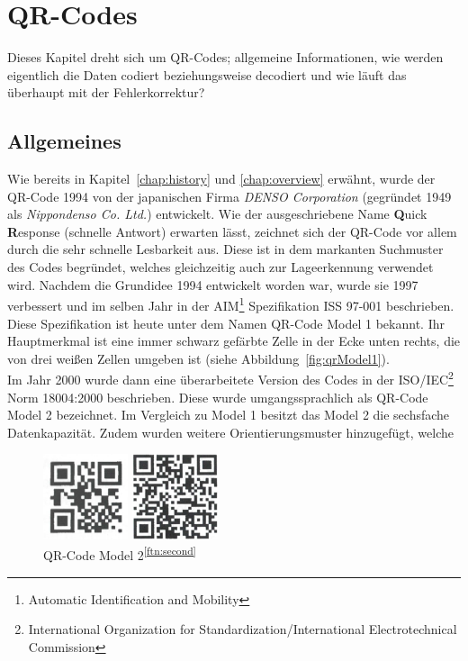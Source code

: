 \section{QR-Codes}\label{chap:qrcodes}
Dieses Kapitel dreht sich um QR-Codes; allgemeine Informationen, wie werden eigentlich die Daten codiert beziehungsweise decodiert und wie läuft das überhaupt mit der Fehlerkorrektur?

\subsection{Allgemeines}
Wie bereits in Kapitel~\ref{chap:history} und \ref{chap:overview} erwähnt, wurde der QR-Code 1994 von der japanischen Firma \textit{DENSO Corporation} (gegründet 1949 als \textit{Nippondenso Co. Ltd.}) entwickelt. Wie der ausgeschriebene Name \textbf{Q}uick \textbf{R}esponse (schnelle Antwort) erwarten lässt, zeichnet sich der QR-Code vor allem durch die sehr schnelle Lesbarkeit aus. Diese ist in dem markanten Suchmuster des Codes begründet, welches gleichzeitig auch zur Lageerkennung verwendet wird.
Nachdem die Grundidee 1994 entwickelt worden war, wurde sie 1997 verbessert und im selben Jahr in der AIM\footnote{Automatic Identification and Mobility} Spezifikation ISS 97-001 beschrieben. Diese Spezifikation ist heute unter dem Namen QR-Code Model 1 bekannt. Ihr Hauptmerkmal ist eine immer schwarz gefärbte Zelle in der Ecke unten rechts, die von drei weißen Zellen umgeben ist (siehe Abbildung~\ref{fig:qrModel1}).\\
Im Jahr 2000 wurde dann eine überarbeitete Version des Codes in der ISO/IEC\footnote{International Organization for Standardization/International Electrotechnical Commission} Norm 18004:2000 beschrieben. Diese wurde umgangssprachlich als QR-Code Model 2 bezeichnet. Im Vergleich zu Model 1 besitzt das Model 2 die sechsfache Datenkapazität. Zudem wurden weitere Orientierungsmuster hinzugefügt, welche \\
\begin{figure}[htbp]
	\parbox{.47\textwidth}
	{
		\centering
		\includegraphics[height=2.5cm]{Bilder/QR_Code_Model_1.png}
		\caption[QR-Code Model 1]{QR-Code Model 1\footnotemark}
		\label{fig:qrModel1}
	}
	\hfill
	\parbox{.47\textwidth}
	{
		\centering
		\includegraphics[height=2.5cm]{Bilder/QR_Code_Model_2.png}
		\caption[QR-Code Model 2]{QR-Code Model 2\textsuperscript{\ref{ftn:second}}}
		\label{fig:qrModel2}
	}
	\hfill
\end{figure}
